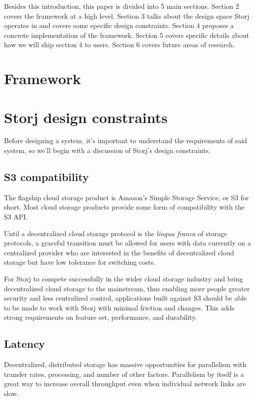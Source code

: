 \documentclass[a4paper,10pt]{article}
\begin{document}
Besides this introduction, this paper is divided into 5 main sections.
Section 2 covers the framework at a high level. Section 3 talks about the design
space Storj operates in and covers some specific design constraints. Section 4
proposes a concrete implementation of the framework. Section 5 covers specific
details about how we will ship section 4 to users. Section 6 covers future
areas of research.

\section{Framework}

\section{Storj design constraints}

Before designing a system, it's important to understand the requirements of
said system, so we'll begin with a discussion of Storj's design constraints.

\subsection{S3 compatibility}

The flagship cloud storage product is Amazon's Simple Storage Service, or S3
for short. Most cloud storage products provide some form of compatibility with
the S3 API.

Until a decentralized cloud storage protocol is the {\em lingua franca} of
storage protocols, a graceful transition must be allowed for users with data
currently on a centralized provider who are interested in the benefits of
decentralized cloud storage but have low tolerance for switching costs.

For Storj to compete successfully in the wider cloud storage industry and bring
decentralized cloud storage to the mainstream, thus enabling more people
greater security and less centralized control, applications built against S3
should be able to be made to work with Storj with minimal friction and changes.
This adds strong requirements on feature set, performance, and durability.

\subsection{Latency}

Decentralized, distributed storage has massive opportunities for parallelism
with transfer rates, processing, and number of other factors. Parallelism by
itself is a great way to increase overall throughput even when individual
network links are slow.
\end{document}
